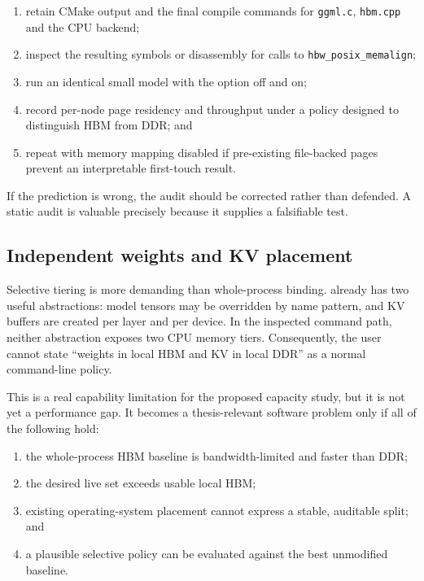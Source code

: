 \begin{enumerate}
  \item retain CMake output and the final compile commands for
        \texttt{ggml.c}, \texttt{hbm.cpp} and the CPU backend;
  \item inspect the resulting symbols or disassembly for calls to
        \texttt{hbw\_posix\_memalign};
  \item run an identical small model with the option off and on;
  \item record per-node page residency and throughput under a policy
        designed to distinguish HBM from DDR; and
  \item repeat with memory mapping disabled if pre-existing file-backed
        pages prevent an interpretable first-touch result.
\end{enumerate}

If the prediction is wrong, the audit should be corrected rather than
defended.  A static audit is valuable precisely because it supplies a
falsifiable test.

\subsection{Independent weights and KV placement}

Selective tiering is more demanding than whole-process binding.
\lcpp{} already has two useful abstractions: model tensors may be
overridden by name pattern, and KV buffers are created per layer and per
device.  In the inspected command path, neither abstraction exposes two
CPU memory tiers.  Consequently, the user cannot state ``weights in
local HBM and KV in local DDR'' as a normal command-line policy.

This is a real capability limitation for the proposed capacity study,
but it is not yet a performance gap.  It becomes a thesis-relevant
software problem only if all of the following hold:

\begin{enumerate}
  \item the whole-process HBM baseline is bandwidth-limited and faster
        than DDR;
  \item the desired live set exceeds usable local HBM;
  \item existing operating-system placement cannot express a stable,
        auditable split; and
  \item a plausible selective policy can be evaluated against the best
        unmodified baseline.
\end{enumerate}

